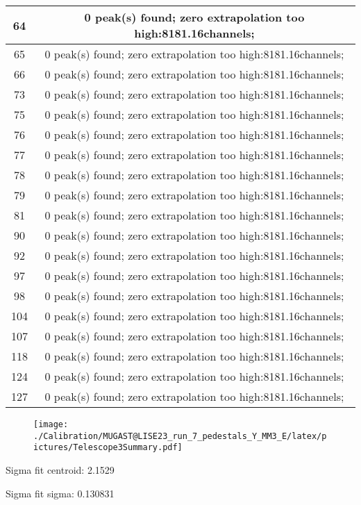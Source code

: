 \documentclass[a4paper,6pt]{article}
\begin{document}
\begin{center}
\begin{tabular}{ | c | c | }
64 &  0 peak(s) found; zero extrapolation too high:8181.16channels;  \\ \hline 
65 &  0 peak(s) found; zero extrapolation too high:8181.16channels;  \\ \hline 
66 &  0 peak(s) found; zero extrapolation too high:8181.16channels;  \\ \hline 
73 &  0 peak(s) found; zero extrapolation too high:8181.16channels;  \\ \hline 
75 &  0 peak(s) found; zero extrapolation too high:8181.16channels;  \\ \hline 
76 &  0 peak(s) found; zero extrapolation too high:8181.16channels;  \\ \hline 
77 &  0 peak(s) found; zero extrapolation too high:8181.16channels;  \\ \hline 
78 &  0 peak(s) found; zero extrapolation too high:8181.16channels;  \\ \hline 
79 &  0 peak(s) found; zero extrapolation too high:8181.16channels;  \\ \hline 
81 &  0 peak(s) found; zero extrapolation too high:8181.16channels;  \\ \hline 
90 &  0 peak(s) found; zero extrapolation too high:8181.16channels;  \\ \hline 
92 &  0 peak(s) found; zero extrapolation too high:8181.16channels;  \\ \hline 
97 &  0 peak(s) found; zero extrapolation too high:8181.16channels;  \\ \hline 
98 &  0 peak(s) found; zero extrapolation too high:8181.16channels;  \\ \hline 
104 &  0 peak(s) found; zero extrapolation too high:8181.16channels;  \\ \hline 
107 &  0 peak(s) found; zero extrapolation too high:8181.16channels;  \\ \hline 
118 &  0 peak(s) found; zero extrapolation too high:8181.16channels;  \\ \hline 
124 &  0 peak(s) found; zero extrapolation too high:8181.16channels;  \\ \hline 
127 &  0 peak(s) found; zero extrapolation too high:8181.16channels;  \\ \hline 
\end{tabular} 
\end{center}
\begin{figure}[htcb!]
\begin{center}
\texttt{[image: ./Calibration/MUGAST@LISE23\_run\_7\_pedestals\_Y\_MM3\_E/latex/pictures/Telescope3Summary.pdf]}
\end{center}
\end{figure}
\pagebreak
Sigma fit centroid: 2.1529

Sigma fit sigma: 0.130831
\end{document}
